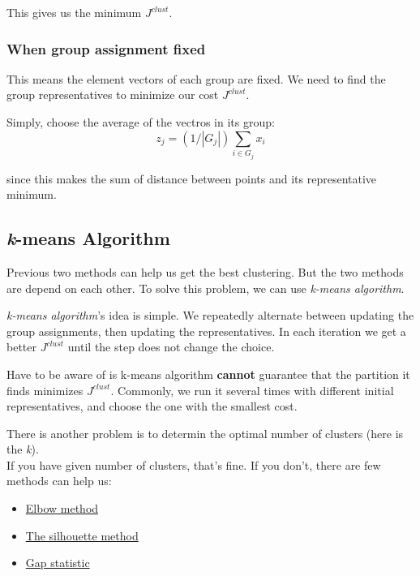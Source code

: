 \documentclass[11pt]{article}
\providecommand{\tightlist}{%
      \setlength{\itemsep}{0pt}\setlength{\parskip}{0pt}}
\begin{document}
This gives us the minimum \(J^{clust}\).

\subsubsection{When group assignment
fixed}\label{when-group-assignment-fixed}

This means the element vectors of each group are fixed. We need to find
the group representatives to minimize our cost \(J^{clust}\).

Simply, choose the average of the vectros in its group:
\[ z_{j} = (1/|G_{j}|)\sum_{i\in G_{j}}x_{i}\]

since this makes the sum of distance between points and its
representative minimum.

\subsection{\texorpdfstring{\emph{k}-means
Algorithm}{k-means Algorithm}}\label{k-means-algorithm}

Previous two methods can help us get the best clustering. But the two
methods are depend on each other. To solve this problem, we can use
\emph{k-means algorithm}.

\emph{k-means algorithm}'s idea is simple. We repeatedly alternate
between updating the group assignments, then updating the
representatives. In each iteration we get a better \(J^{clust}\) until
the step does not change the choice.

Have to be aware of is k-means algorithm \textbf{cannot} guarantee that
the partition it finds minimizes \(J^{clust}\). Commonly, we run it
several times with different initial representatives, and choose the one
with the smallest cost.

There is another problem is to determin the optimal number of clusters
(here is the \emph{k}).\\
If you have given number of clusters, that's fine. If you don't, there
are few methods can help us:

\begin{itemize}
\tightlist
\item
  \href{https://en.wikipedia.org/wiki/Elbow_method_\%28clustering\%29}{Elbow
  method}
\item
  \href{https://en.wikipedia.org/wiki/Silhouette_\%28clustering\%29}{The
  silhouette method}
\item
  \href{http://web.stanford.edu/~hastie/Papers/gap.pdf}{Gap statistic}
\end{itemize}
\end{document}
